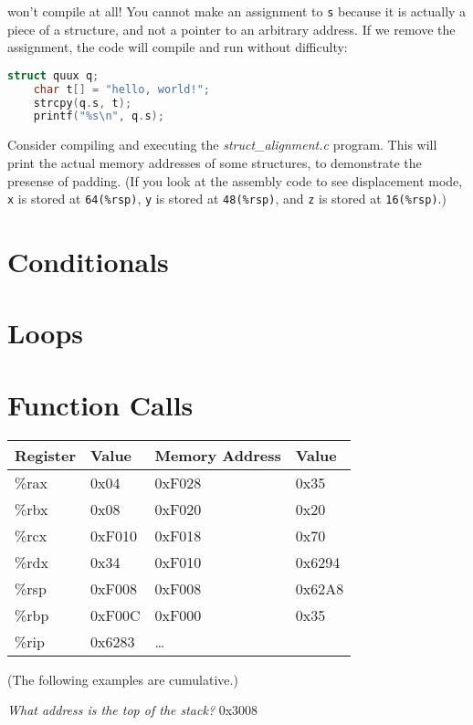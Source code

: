 \documentclass{article}
\begin{document}
won't compile at all!
You cannot make an assignment to \lstinline{s} because it is actually a piece of a structure, and not a pointer to an arbitrary address.
If we remove the assignment, the code will compile and run without difficulty:

\begin{lstlisting}[language=C]
    struct quux q;
    char t[] = "hello, world!";
    strcpy(q.s, t);
    printf("%s\n", q.s);
\end{lstlisting}

Consider compiling and executing the \textit{struct\_alignment.c} program.
This will print the actual memory addresses of some structures, to demonstrate the presense of padding.
(If you look at the assembly code to see displacement mode, \lstinline{x} is stored at \lstinline{64(%rsp)}, \lstinline{y} is stored at \lstinline{48(%rsp)}, and \lstinline{z} is stored at \lstinline{16(%rsp)}.)

\section{Conditionals}

\section{Loops}

\section{Function Calls}

\begin{tabular}{|l|l||l|l|} \hline
Register & Value & Memory Address & Value \\ \hline
\%rax & 0x04   & 0xF028 & 0x35   \\ \hline
\%rbx & 0x08   & 0xF020 & 0x20   \\ \hline
\%rcx & 0xF010 & 0xF018 & 0x70   \\ \hline
\%rdx & 0x34   & 0xF010 & 0x6294 \\ \hline
\%rsp & 0xF008 & 0xF008 & 0x62A8 \\ \hline
\%rbp & 0xF00C & 0xF000 & 0x35   \\ \hline
\%rip & 0x6283 & \dots  &        \\ \hline
\end{tabular}

(The following examples are cumulative.)

\textit{What address is the top of the stack?} 0x3008
\end{document}
